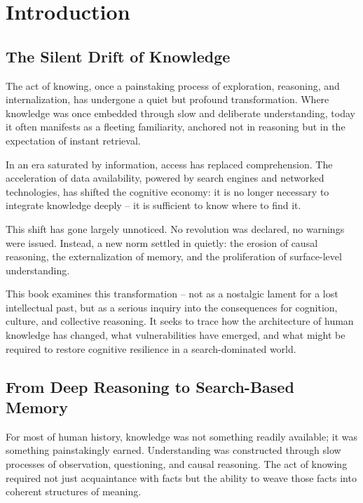 \chapter{Introduction}

\section{The Silent Drift of Knowledge}

The act of knowing, once a painstaking process of exploration,
reasoning, and internalization, has undergone a quiet but profound
transformation. Where knowledge was once embedded through slow and
deliberate understanding, today it often manifests as a fleeting
familiarity, anchored not in reasoning but in the expectation of instant
retrieval.

In an era saturated by information, access has replaced comprehension.
The acceleration of data availability, powered by search engines and
networked technologies, has shifted the cognitive economy: it is no
longer necessary to integrate knowledge deeply -- it is sufficient to
know where to find it.

This shift has gone largely unnoticed. No revolution was declared, no
warnings were issued. Instead, a new norm settled in quietly: the
erosion of causal reasoning, the externalization of memory, and the
proliferation of surface-level understanding.

This book examines this transformation -- not as a nostalgic lament for a
lost intellectual past, but as a serious inquiry into the consequences
for cognition, culture, and collective reasoning. It seeks to trace how
the architecture of human knowledge has changed, what vulnerabilities
have emerged, and what might be required to restore cognitive resilience
in a search-dominated world.




\section{From Deep Reasoning to Search-Based Memory}

For most of human history, knowledge was not something readily
available; it was something painstakingly earned. Understanding was
constructed through slow processes of observation, questioning, and
causal reasoning. The act of knowing required not just acquaintance with
facts but the ability to weave those facts into coherent structures of
meaning.

